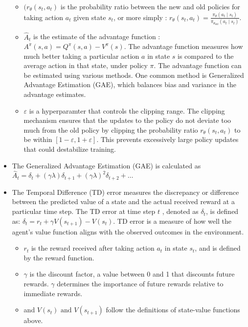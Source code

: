\documentclass[12pt,oneside,letterpaper]{article}
\begin{document}
\begin{itemize}
\begin{itemize} 
\item $(r_\theta(s_t, a_t)$ is the probability ratio between the new and old policies for taking action $a_t$ given state $s_t$, or more simply : \( r_\theta(s_t, a_t) = \frac{\pi_\theta(a_t \mid s_t)}{\pi_{\theta_{\text{old}}}(a_t \mid s_t)} \). 
\item \( \hat{A}_t \) is the estimate of the advantage function : \( A^\pi(s, a) = Q^\pi(s, a) - V^\pi(s) \).  The advantage function measures how much better taking a particular action $a$ in state $s$ is compared to the average action in that state, under policy $\pi$. The advantage function can be estimated using various methods. One common method is Generalized Advantage Estimation (GAE), which balances bias and variance in the advantage estimates.
\item $\varepsilon$ is a hyperparamter that controls the clipping range. The clipping mechanism ensures that the updates to the policy do not deviate too much from the old policy by clipping the probability ratio $r_\theta(s_t, a_t)$ to be within  \( [1 - \varepsilon, 1 + \varepsilon]\). This prevents excessively large policy updates that could destabilize training.
\end{itemize}
\item The Generalized Advantage Estimation (GAE) is calculated as \( \hat{A}_t = \delta_t + (\gamma \lambda) \delta_{t+1} + (\gamma \lambda)^2 \delta_{t+2} + \ldots \)

\item The Temporal Difference (TD) error measures the discrepancy or difference between the predicted value of a state and the actual received reward at a particular time step. The TD error at time step $t$ , denoted as $\delta_t$, is defined as: \( \delta_t = r_t + \gamma V(s_{t+1}) - V(s_t) \). TD error is a measure of how well the agent's value function aligns with the observed outcomes in the environment.
\begin{itemize}
\item $r_t$ is the reward received after taking action $a_t$ in state $s_t$, and is defined by the reward function.
\item $\gamma$  is the discount factor, a value between 0 and 1 that discounts future rewards. $\gamma$ determines the importance of future rewards relative to immediate rewards.
\item and $V(s_t) \text{ and } V(s_{t + 1}) $ follow the definitions of state-value functions above.
\end{itemize}
\end{itemize}
\end{document}
